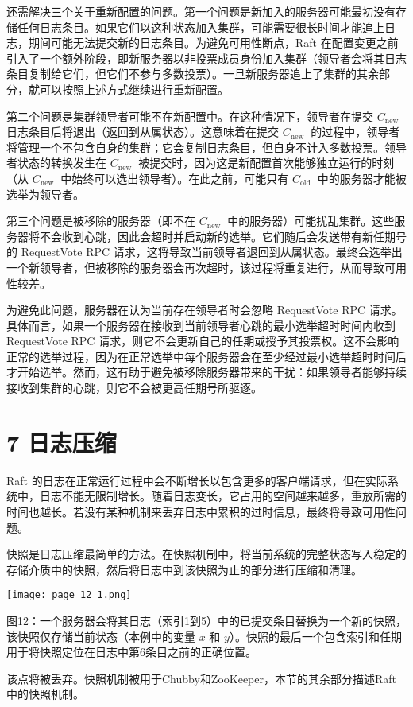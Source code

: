 \documentclass[12pt,a4paper]{report} %
\begin{document}
还需解决三个关于重新配置的问题。第一个问题是新加入的服务器可能最初没有存储任何日志条目。如果它们以这种状态加入集群，可能需要很长时间才能追上日志，期间可能无法提交新的日志条目。为避免可用性断点，Raft 在配置变更之前引入了一个额外阶段，即新服务器以非投票成员身份加入集群（领导者会将其日志条目复制给它们，但它们不参与多数投票）。一旦新服务器追上了集群的其余部分，就可以按照上述方式继续进行重新配置。

第二个问题是集群领导者可能不在新配置中。在这种情况下，领导者在提交 $C_{\text {new }}$ 日志条目后将退出（返回到从属状态）。这意味着在提交 $C_{\text {new }}$ 的过程中，领导者将管理一个不包含自身的集群；它会复制日志条目，但自身不计入多数投票。领导者状态的转换发生在 $C_{\text {new }}$ 被提交时，因为这是新配置首次能够独立运行的时刻（从 $C_{\text {new }}$ 中始终可以选出领导者）。在此之前，可能只有 $C_{\text {old }}$ 中的服务器才能被选举为领导者。

第三个问题是被移除的服务器（即不在 $C_{\text {new }}$ 中的服务器）可能扰乱集群。这些服务器将不会收到心跳，因此会超时并启动新的选举。它们随后会发送带有新任期号的 RequestVote RPC 请求，这将导致当前领导者退回到从属状态。最终会选举出一个新领导者，但被移除的服务器会再次超时，该过程将重复进行，从而导致可用性较差。

为避免此问题，服务器在认为当前存在领导者时会忽略 RequestVote RPC 请求。具体而言，如果一个服务器在接收到当前领导者心跳的最小选举超时时间内收到 RequestVote RPC 请求，则它不会更新自己的任期或授予其投票权。这不会影响正常的选举过程，因为在正常选举中每个服务器会在至少经过最小选举超时时间后才开始选举。然而，这有助于避免被移除服务器带来的干扰：如果领导者能够持续接收到集群的心跳，则它不会被更高任期号所驱逐。

\section*{7 日志压缩}

Raft 的日志在正常运行过程中会不断增长以包含更多的客户端请求，但在实际系统中，日志不能无限制增长。随着日志变长，它占用的空间越来越多，重放所需的时间也越长。若没有某种机制来丢弃日志中累积的过时信息，最终将导致可用性问题。

快照是日志压缩最简单的方法。在快照机制中，将当前系统的完整状态写入稳定的存储介质中的快照，然后将日志中到该快照为止的部分进行压缩和清理。
\begin{center}
\texttt{[image: page\_12\_1.png]}
\end{center}
\begin{center} 图12：一个服务器会将其日志（索引1到5）中的已提交条目替换为一个新的快照，该快照仅存储当前状态（本例中的变量 $x$ 和 $y$）。快照的最后一个包含索引和任期用于将快照定位在日志中第6条目之前的正确位置。

\end{center} 该点将被丢弃。快照机制被用于Chubby和ZooKeeper，本节的其余部分描述Raft中的快照机制。
\end{document}
